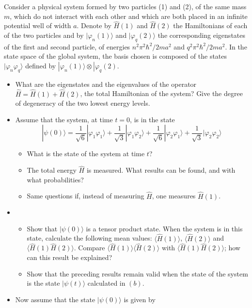 \documentclass[12pt,a4paper]{article}
\newenvironment{problem}[2][Problem]{\begin{trivlist}
\item[\hskip \labelsep {\bfseries #1}\hskip \labelsep {\bfseries #2.}]}{\end{trivlist}}
\begin{document}
\begin{problem}{4}
[C-T Exercise 3-16] Consider a physical system formed by two particles (1) and (2), of the same mass $m$, which do not interact with each other and which are both placed in an infinite potential well of width $a$. Denote by $\hat{H}(1)$ and $\hat{H}(2)$ the Hamiltonians of each of the two particles and by $|\varphi_n(1)\rangle$ and $|\varphi_q(2)\rangle$ the corresponding eigenstates of the first and second particle, of energies $n^2\pi^2\hbar^2/2ma^2$ and $q^2\pi^2\hbar^2/2ma^2$. In the state space of the global system, the basis chosen is composed of the states $|\varphi_n\varphi_q\rangle$ defined by $|\varphi_n(1)\rangle\otimes|\varphi_q(2)$.
\begin{itemize}
\item[(a)] What are the eigenstates and the eigenvalues of the operator $\hat{H}=\hat{H}(1)+\hat{H}(2)$, the total Hamiltonian of the system? Give the degree of degeneracy of the two lowest energy levels.
\item[(b)] Assume that the system, at time $t=0$, is in the state
\[
|\psi(0)\rangle=\frac{1}{\sqrt{6}}|\varphi_1\varphi_1\rangle+\frac{1}{\sqrt{3}}|\varphi_1\varphi_2\rangle+\frac{1}{\sqrt{6}}|\varphi_2\varphi_1\rangle+\frac{1}{\sqrt{3}}|\varphi_2\varphi_2\rangle
\]
\begin{itemize}
\item[i.] What is the state of the system at time $t$?
\item[ii.] The total energy $\hat{H}$ is measured. What results can be found, and with what probabilities?
\item[iii.] Same questions if, instead of measuring $\hat{H}$, one measures $\hat{H}(1)$.
\end{itemize}
\item[(c)]
\begin{itemize}
\item[i.] Show that $|\psi(0)\rangle$ is a tensor product state. When the system is in this state, calculate the following mean values: $\langle\hat{H}(1)\rangle$, $\langle\hat{H}(2)\rangle$ and $\langle\hat{H}(1)\hat{H}(2)\rangle$. Compare $\langle\hat{H}(1)\rangle\langle\hat{H}(2)\rangle$ with $\langle\hat{H}(1)\hat{H}(2)\rangle$; how can this result be explained?
\item[ii.] Show that the preceding results remain valid when the state of the system is the state $|\psi(t)\rangle$ calculated in $(b)$.
\end{itemize}
\item[(d)] Now assume that the state $|\psi(0)\rangle$ is given by

\end{itemize}
\end{problem}
\end{document}
